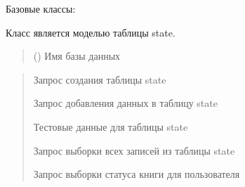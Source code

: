 \documentclass[letterpaper,10pt,russian]{sphinxmanual}
\begin{document}
\begin{fulllineitems}
\label{\detokenize{database.sqlite3_interface.tables:database.sqlite3_interface.tables.state.State}}
\pysigstartsignatures
{}
\pysigstopsignatures
\sphinxAtStartPar
Базовые классы: {\hyperref[\detokenize{database.sqlite3_interface.tables:database.sqlite3_interface.tables.table.Table}]{}}

\sphinxAtStartPar
Класс является моделью таблицы state.
\begin{quote}\begin{description}
\sphinxAtStartPar
{} () \textendash{} Имя базы данных

\end{description}\end{quote}
\begin{description}
\begin{quote}\begin{description}
\sphinxAtStartPar
Запрос создания таблицы state

\sphinxAtStartPar
Запрос добавления данных в таблицу state

\sphinxAtStartPar
Тестовые данные для таблицы state

\sphinxAtStartPar
Запрос выборки всех записей из таблицы state

\sphinxAtStartPar
Запрос выборки статуса книги для пользователя

\end{description}\end{quote}

\begin{sphinxVerbatim}[commandchars=\\\{\}]
\end{sphinxVerbatim}


\end{description}
\end{fulllineitems}
\end{document}
